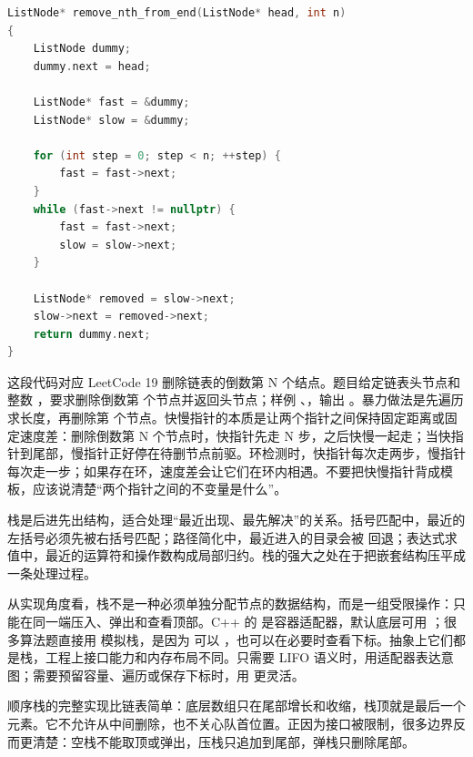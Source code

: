 \begin{lstlisting}[language=C++,caption={LeetCode 19 删除倒数第 N 个节点：虚拟头节点统一删除逻辑}]
ListNode* remove_nth_from_end(ListNode* head, int n)
{
    ListNode dummy;
    dummy.next = head;

    ListNode* fast = &dummy;
    ListNode* slow = &dummy;

    for (int step = 0; step < n; ++step) {
        fast = fast->next;
    }
    while (fast->next != nullptr) {
        fast = fast->next;
        slow = slow->next;
    }

    ListNode* removed = slow->next;
    slow->next = removed->next;
    return dummy.next;
}
\end{lstlisting}

这段代码对应 LeetCode 19 删除链表的倒数第 N 个结点。题目给定链表头节点和整数 ，要求删除倒数第  个节点并返回头节点；样例 、，输出 。暴力做法是先遍历求长度，再删除第  个节点。快慢指针的本质是让两个指针之间保持固定距离或固定速度差：删除倒数第 N 个节点时，快指针先走 N 步，之后快慢一起走；当快指针到尾部，慢指针正好停在待删节点前驱。环检测时，快指针每次走两步，慢指针每次走一步；如果存在环，速度差会让它们在环内相遇。不要把快慢指针背成模板，应该说清楚“两个指针之间的不变量是什么”。

栈是后进先出结构，适合处理“最近出现、最先解决”的关系。括号匹配中，最近的左括号必须先被右括号匹配；路径简化中，最近进入的目录会被  回退；表达式求值中，最近的运算符和操作数构成局部归约。栈的强大之处在于把嵌套结构压平成一条处理过程。

从实现角度看，栈不是一种必须单独分配节点的数据结构，而是一组受限操作：只能在同一端压入、弹出和查看顶部。C++ 的  是容器适配器，默认底层可用 ；很多算法题直接用  模拟栈，是因为  可以 ，也可以在必要时查看下标。抽象上它们都是栈，工程上接口能力和内存布局不同。只需要 LIFO 语义时，用适配器表达意图；需要预留容量、遍历或保存下标时，用  更灵活。

顺序栈的完整实现比链表简单：底层数组只在尾部增长和收缩，栈顶就是最后一个元素。它不允许从中间删除，也不关心队首位置。正因为接口被限制，很多边界反而更清楚：空栈不能取顶或弹出，压栈只追加到尾部，弹栈只删除尾部。


